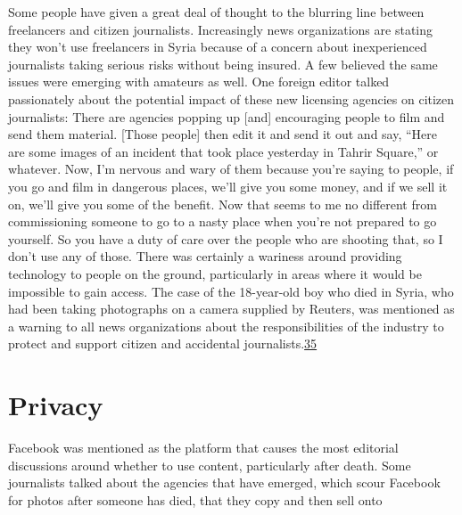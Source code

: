 \documentclass[symmetric, notoc, nobib]{towcenter-book}
\begin{document}
Some people have given a great deal of thought to the blurring line between
freelancers and citizen journalists. Increasingly news organizations are stating
they won't use freelancers in Syria because of a concern about inexperienced
journalists taking serious risks without being insured. A few believed
the same issues were emerging with amateurs as well.
One foreign editor talked passionately about the potential impact of these
new licensing agencies on citizen journalists:
There are agencies popping up [and] encouraging people to film and
send them material. [Those people] then edit it and send it out and
say, ``Here are some images of an incident that took place yesterday
in Tahrir Square,'' or whatever. Now, I'm nervous and wary of them
because you're saying to people, if you go and film in dangerous
places, we'll give you some money, and if we sell it on, we'll give you
some of the benefit. Now that seems to me no different from commissioning
someone to go to a nasty place when you're not prepared
to go yourself. So you have a duty of care over the people who are
shooting that, so I don't use any of those.
There was certainly a wariness around providing technology to people
on the ground, particularly in areas where it would be impossible to gain
access. The case of the 18-year-old boy who died in Syria, who had been
taking photographs on a camera supplied by Reuters, was mentioned as a
warning to all news organizations about the responsibilities of the industry
to protect and support citizen and accidental journalists.{\href{#endnotes}{35}}
\section{Privacy}
Facebook was mentioned as the platform that causes the most editorial
discussions around whether to use content, particularly after death. Some
journalists talked about the agencies that have emerged, which scour Facebook
for photos after someone has died, that they copy and then sell onto
\end{document}
